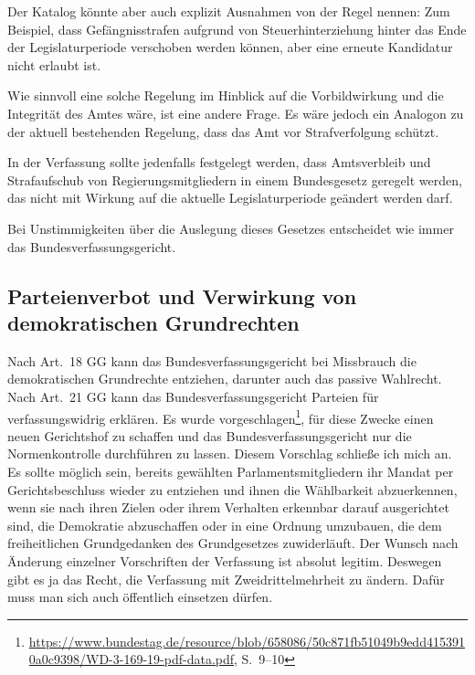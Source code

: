 Der Katalog könnte aber auch explizit Ausnahmen von der Regel nennen: Zum Beispiel, dass Gefängnisstrafen aufgrund von Steuerhinterziehung hinter das Ende der Legislaturperiode verschoben werden können, aber eine erneute Kandidatur nicht erlaubt ist.

Wie sinnvoll eine solche Regelung im Hinblick auf die Vorbildwirkung und die Integrität des Amtes wäre, ist eine andere Frage.
Es wäre jedoch ein Analogon zu der aktuell bestehenden Regelung, dass das Amt vor Strafverfolgung schützt.

In der Verfassung sollte jedenfalls festgelegt werden, dass Amtsverbleib und Strafaufschub von Regierungsmitgliedern in einem Bundesgesetz geregelt werden, das nicht mit Wirkung auf die aktuelle Legislaturperiode geändert werden darf.

Bei Unstimmigkeiten über die Auslegung dieses Gesetzes entscheidet wie immer das Bundesverfassungsgericht.

\subsection{Parteienverbot und Verwirkung von demokratischen Grundrechten}
Nach Art.~18 GG kann das Bundesverfassungsgericht bei Missbrauch die demokratischen Grundrechte entziehen, darunter auch das passive Wahlrecht.
Nach Art.~21 GG kann das Bundesverfassungsgericht Parteien für verfassungswidrig erklären.
Es wurde vorgeschlagen\footnote{\url{https://www.bundestag.de/resource/blob/658086/50c871fb51049b9edd4153910a0c9398/WD-3-169-19-pdf-data.pdf}, S.~9--10}, für diese Zwecke einen neuen Gerichtshof zu schaffen und das Bundesverfassungsgericht nur die Normenkontrolle durchführen zu lassen.
Diesem Vorschlag schließe ich mich an.
Es sollte möglich sein, bereits gewählten Parlamentsmitgliedern ihr Mandat per Gerichtsbeschluss wieder zu entziehen und ihnen die Wählbarkeit abzuerkennen, wenn sie nach ihren Zielen oder ihrem Verhalten erkennbar darauf ausgerichtet sind,
die Demokratie abzuschaffen oder in eine Ordnung umzubauen, die dem freiheitlichen Grundgedanken des Grundgesetzes zuwiderläuft.
Der Wunsch nach Änderung einzelner Vorschriften der Verfassung ist absolut legitim.
Deswegen gibt es ja das Recht, die Verfassung mit Zweidrittelmehrheit zu ändern.
Dafür muss man sich auch öffentlich einsetzen dürfen.

